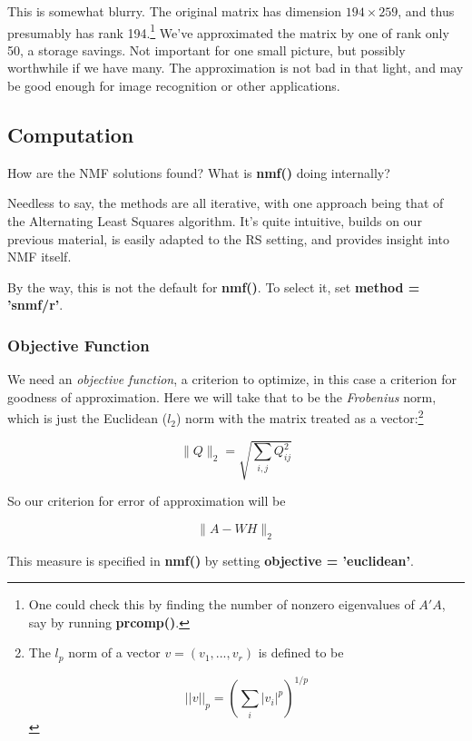 This is somewhat blurry.  The original matrix has dimension $194 \times
259$, and thus presumably has rank 194.\footnote{One could check this by
finding the number of nonzero eigenvalues of $A'A$, say by running
\textbf{prcomp()}.} We've approximated the matrix by one of rank only
50, a storage savings.  Not important for one small picture, but
possibly worthwhile if we have many. The approximation is not bad in
that light, and may be good enough for image recognition or other
applications.

\subsection{Computation}

How are the NMF solutions found?  What is {\bf nmf()} doing internally?

Needless to say, the methods are all iterative, with one approach being
that of the Alternating Least Squares algorithm.  It's quite intuitive,
builds on our previous material, is easily adapted to the RS setting,
and provides insight into NMF itself.

By the way, this is not the default for {\bf nmf()}.  To select it, set
{\bf method = 'snmf/r'}.

\subsubsection{Objective Function}

We need an {\it objective function}, a criterion to optimize, in this
case a criterion for goodness of approximation. Here we will take that
to be the {\it Frobenius} norm, which is just the Euclidean ($l_2$)
norm with the matrix treated as a vector:\footnote{The $l_p$ norm of a
vector $v = (v_1,...,v_r)$ is defined to be

$$
||v||_p = \left (\sum_i |v_i|^p \right )^{1/p}
$$
}

\begin{equation}
\label{froben}
\|Q\|_2 = 
\sqrt{
\sum_{i,j} Q_{ij}^2
}
\end{equation}

So our criterion for error of approximation will be

\begin{equation}
\label{errawh}
\|A - WH\|_2
\end{equation}

This measure is specified in {\bf nmf()} by setting {\bf objective =
'euclidean'}.


